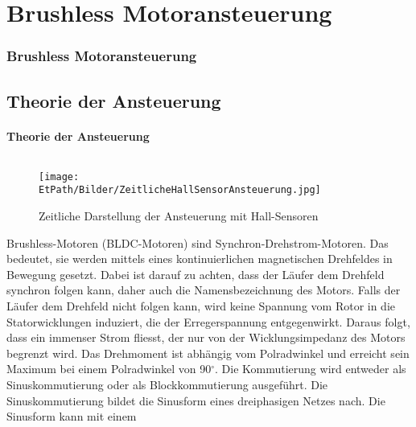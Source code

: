 \ifSTANDALONE
\section{Brushless Motoransteuerung}
\fi
\ifEMBED
\subsubsection{Brushless Motoransteuerung}
\fi

\ifEMBED
    \BLDCcollab
\fi
    \ifSTANDALONE
    \subsection{Theorie der Ansteuerung}
    \fi
    \ifEMBED
    \paragraph{Theorie der Ansteuerung}$~~$\vspace{2mm}\\
    \fi
    \ifEMBED
        \begin{wrapfigure}{r}{0.50\textwidth}
           	\texttt{[image: \\EtPath/Bilder/ZeitlicheHallSensorAnsteuerung.jpg]}
           	\caption[Zeitliche Darstellung der Ansteuerung mit Hall-Sensoren]
           	{Zeitliche Darstellung der Ansteuerung mit Hall-Sensoren \cite{AppNote:BrushlessuC}}
           	\centering
            \label{abb:ZeitlicheAnsteuerungBrushlessMotor}
        \end{wrapfigure}
    \fi
        Brushless-Motoren (BLDC-Motoren) sind Synchron-Drehstrom-Motoren. Das 
        bedeutet, sie werden mittels eines kontinuierlichen magnetischen 
        Drehfeldes in Bewegung gesetzt.  Dabei ist darauf zu achten, dass der 
        Läufer dem Drehfeld synchron folgen kann, daher auch die 
        Namensbezeichnung des Motors. Falls der Läufer dem Drehfeld nicht 
        folgen kann, wird keine Spannung vom Rotor in die Statorwicklungen 
        induziert, die der Erregerspannung entgegenwirkt. Daraus folgt, dass 
        ein immenser Strom fliesst, der nur von der Wicklungsimpedanz des 
        Motors begrenzt wird. Das Drehmoment ist abhängig vom Polradwinkel und 
        erreicht sein Maximum bei einem Polradwinkel von 90$^\circ$. Die 
        Kommutierung wird entweder als Sinuskommutierung oder als 
        Blockkommutierung ausgeführt. Die Sinuskommutierung bildet die 
        Sinusform eines dreiphasigen Netzes nach. Die Sinusform kann mit einem 
